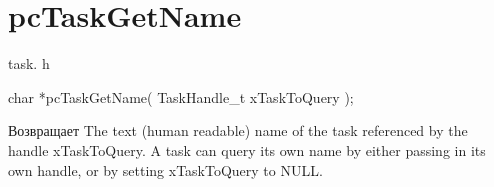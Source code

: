 \hypertarget{group__pc_task_get_name}{}\section{pc\+Task\+Get\+Name}
\label{group__pc_task_get_name}
task. h 
\begin{DoxyPre}char *pcTaskGetName( TaskHandle\_t xTaskToQuery );\end{DoxyPre}


\begin{DoxyReturn}{Возвращает}
The text (human readable) name of the task referenced by the handle x\+Task\+To\+Query. A task can query its own name by either passing in its own handle, or by setting x\+Task\+To\+Query to N\+U\+LL. 
\end{DoxyReturn}
